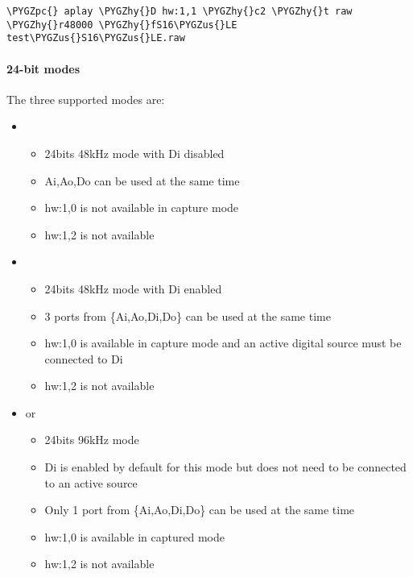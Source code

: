 \documentclass[a4paper,8pt,english]{sphinxmanual}
\def\PYGZus{\char`\_}
\def\PYGZpc{\char`\%}
\def\PYGZhy{\char`\-}
\begin{document}
\begin{Verbatim}[commandchars=\\\{\}]
\PYGZpc{} aplay \PYGZhy{}D hw:1,1 \PYGZhy{}c2 \PYGZhy{}t raw \PYGZhy{}r48000 \PYGZhy{}fS16\PYGZus{}LE test\PYGZus{}S16\PYGZus{}LE.raw
\end{Verbatim}


\paragraph{24-bit modes}
\label{sound/cards/audiophile-usb:id1}
The three supported modes are:
\begin{itemize}
\item {} 
\begin{itemize}
\item {} 
24bits 48kHz mode with Di disabled

\item {} 
Ai,Ao,Do can be used at the same time

\item {} 
hw:1,0 is not available in capture mode

\item {} 
hw:1,2 is not available

\end{itemize}

\item {} 
\begin{itemize}
\item {} 
24bits 48kHz mode with Di enabled

\item {} 
3 ports from \{Ai,Ao,Di,Do\} can be used at the same time

\item {} 
hw:1,0 is available in capture mode and an active digital source must be
connected to Di

\item {} 
hw:1,2 is not available

\end{itemize}

\item {} 
 or 
\begin{itemize}
\item {} 
24bits 96kHz mode

\item {} 
Di is enabled by default for this mode but does not need to be connected
to an active source

\item {} 
Only 1 port from \{Ai,Ao,Di,Do\} can be used at the same time

\item {} 
hw:1,0 is available in captured mode

\item {} 
hw:1,2 is not available

\end{itemize}

\end{itemize}
\end{document}
